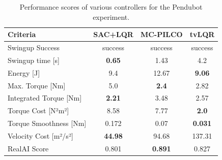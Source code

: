 
\begin{table}[H]
  \centering
 \begin{tabular}{lccc}
 \hline
 Criteria & SAC+LQR & MC-PILCO & tvLQR \\
 \hline
 Swingup Success & success & success & success \\
 Swingup time [s] & \textbf{0.65} & 1.43 & 4.2 \\
 Energy [J] & 9.4 & 12.67 & \textbf{9.06} \\
 Max. Torque [Nm] & 5.0 & \textbf{2.4} & 2.82 \\
 Integrated Torque [Nm] & \textbf{2.21} & 3.48 & 2.57 \\
 Torque Cost [N²m²] & 8.58 & 7.77 & \textbf{2.0} \\
 Torque Smoothness [Nm] & 0.172 & 0.07 & \textbf{0.031} \\
 Velocity Cost [m²/s²] & \textbf{44.98} & 94.68 & 137.31 \\
 RealAI Score & 0.801 & \textbf{0.891} & 0.827 \\
 \hline
 \end{tabular}
 \caption{Performance scores of various controllers for the Pendubot experiment.}
 \label{tab:performance_pendubot}
\end{table}

